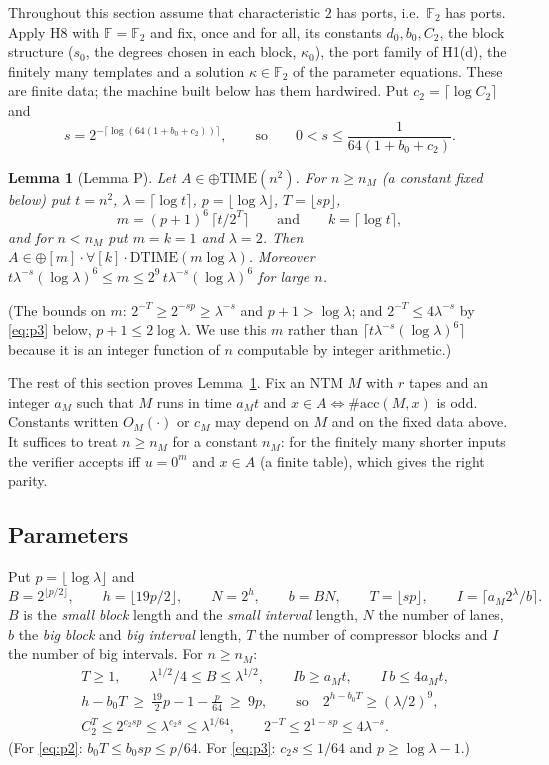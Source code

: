 \documentclass[11pt]{article}
\newtheorem{lemma}[theorem]{Lemma}
\theoremstyle{definition}
\theoremstyle{remark}
\newcommand{\F}{\mathbb F}
\newcommand{\DTIME}{\mathrm{DTIME}}
\newcommand{\parTIME}{\oplus\mathrm{TIME}}
\newcommand{\acc}{\#\mathrm{acc}}
\begin{document}
Throughout this section assume that characteristic $2$ has ports, i.e.\ $\F_2$ has ports. Apply H8 with $\F=\F_2$ and fix, once
and for all, its constants $d_0,b_0,C_2$, the block structure ($s_0$, the degrees chosen in each block, $\kappa_0$), the port family
of H1(d), the finitely many templates and a solution $\kappa\in\F_2$ of the parameter equations. These are finite data; the machine
built below has them hardwired. Put $c_2=\lceil\log C_2\rceil$ and
\[
  s=2^{-\lceil\log(64(1+b_0+c_2))\rceil},\qquad\text{so}\qquad 0<s\le\frac{1}{64(1+b_0+c_2)}.
\]

\begin{lemma}[Lemma P]\label{lem:P}
Let $A\in\parTIME(n^2)$. For $n\ge n_M$ (a constant fixed below) put $t=n^2$, $\lambda=\lceil\log t\rceil$,
$p=\lfloor\log\lambda\rfloor$, $T=\lfloor sp\rfloor$,
\[
 m=(p+1)^6\,\lceil t/2^{T}\rceil\qquad\text{and}\qquad k=\lceil\log t\rceil ,
\]
and for $n<n_M$ put $m=k=1$ and $\lambda=2$. Then $A\in\oplus[m]\cdot\forall[k]\cdot\DTIME(m\log\lambda)$. Moreover
$t\lambda^{-s}(\log\lambda)^6\le m\le2^9\,t\lambda^{-s}(\log\lambda)^6$ for large $n$.
\end{lemma}
(The bounds on $m$: $2^{-T}\ge2^{-sp}\ge\lambda^{-s}$ and $p+1>\log\lambda$; and $2^{-T}\le4\lambda^{-s}$ by \eqref{eq:p3} below,
$p+1\le2\log\lambda$. We use this $m$ rather than $\lceil t\lambda^{-s}(\log\lambda)^6\rceil$ because it is an integer function of $n$
computable by integer arithmetic.)

The rest of this section proves Lemma~\ref{lem:P}. Fix an NTM $M$ with $r$ tapes and an integer $a_M$ such that $M$ runs in time
$a_Mt$ and $x\in A\iff\acc(M,x)$ is odd. Constants written $O_M(\cdot)$ or $c_M$ may depend on $M$ and on the fixed data above. It
suffices to treat $n\ge n_M$ for a constant $n_M$: for the finitely many shorter inputs the verifier accepts iff $u=0^m$ and
$x\in A$ (a finite table), which gives the right parity.

\subsection{Parameters}\label{subsec:params}
Put $p=\lfloor\log\lambda\rfloor$ and
\[
 B=2^{\lfloor p/2\rfloor},\qquad h=\lfloor 19p/2\rfloor,\qquad N=2^h,\qquad b=BN,\qquad T=\lfloor sp\rfloor,\qquad
 I=\lceil a_M2^{\lambda}/b\rceil .
\]
$B$ is the \emph{small block} length and the \emph{small interval} length, $N$ the number of lanes, $b$ the \emph{big block} and
\emph{big interval} length, $T$ the number of compressor blocks and $I$ the number of big intervals. For $n\ge n_M$:
\begin{align}
 &T\ge1,\qquad \lambda^{1/2}/4\le B\le\lambda^{1/2},\qquad Ib\ge a_Mt,\qquad I\,b\le 4a_Mt, \label{eq:p1}\\
 &h-b_0T\ \ge\ \tfrac{19}{2}p-1-\tfrac{p}{64}\ \ge\ 9p,\qquad\text{so}\quad 2^{h-b_0T}\ge(\lambda/2)^9, \label{eq:p2}\\
 &C_2^{T}\le2^{c_2sp}\le\lambda^{c_2s}\le\lambda^{1/64},\qquad 2^{-T}\le2^{1-sp}\le4\lambda^{-s}. \label{eq:p3}
\end{align}
(For \eqref{eq:p2}: $b_0T\le b_0sp\le p/64$. For \eqref{eq:p3}: $c_2s\le1/64$ and $p\ge\log\lambda-1$.)
\end{document}
